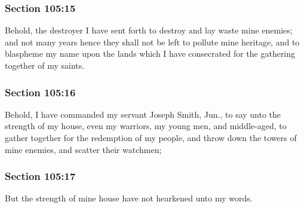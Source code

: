 	\subsubsection{Section 105:15} %
		\label{DC105-15}

		Behold, the destroyer I have sent forth to destroy and lay waste mine enemies; and not many years hence they shall not be left to pollute mine heritage, and to blaspheme my name upon the lands which I have consecrated for the gathering together of my saints.


	\subsubsection{Section 105:16} %
		\label{DC105-16}

		Behold, I have commanded my servant Joseph Smith, Jun., to say unto the strength of my house, even my warriors, my young men, and middle-aged, to gather together for the redemption of my people, and throw down the towers of mine enemies, and scatter their watchmen;


	\subsubsection{Section 105:17} %
		\label{DC105-17}

		But the strength of mine house have not hearkened unto my words.


